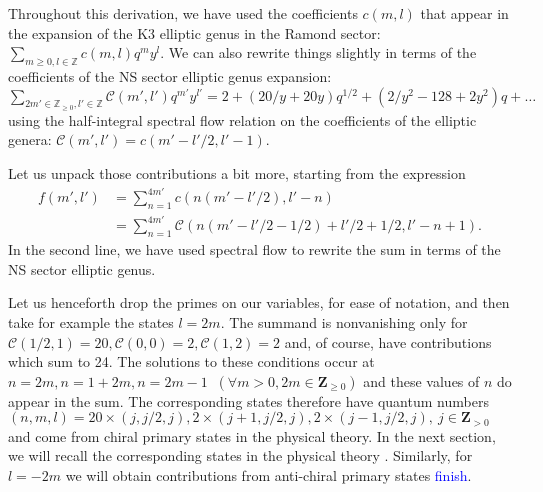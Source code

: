 \documentclass[11pt]{amsart}
\newcommand{\Z}{\mathbf Z}
\theoremstyle{thm}
\numberwithin{equation}{subsection}
\theoremstyle{def}
\theoremstyle{rem}
\begin{document}
Throughout this derivation, we have used the coefficients $c(m, l)$ that appear in the expansion of the K3 elliptic genus in the Ramond sector: $\sum_{m \geq 0, l \in \mathbb{Z}} c(m, l) q^m y^l$. We can also rewrite things slightly in terms of the coefficients of the NS sector elliptic genus expansion: $\sum_{2 m' \in \mathbb{Z}_{\geq 0}, l' \in \mathbb{Z}} \mathcal{C}(m', l') q^{m'} y^{l'} = 2 + (20/y + 20 y)q^{1/2} + (2/y^2 - 128 + 2 y^2)q + \ldots$ using the half-integral spectral flow relation on the coefficients of the elliptic genera: $\mathcal{C}(m', l') = c(m'-l'/2, l'-1)$. 


Let us unpack those contributions a bit more, starting from the expression 
\begin{align*}\label{eq:fml1}
f(m', l') &= \sum_{n=1}^{4m'}c(n(m'-l'/2), l'-n) \\
&= \sum_{n=1}^{4m'}\mathcal{C}(n(m'-l'/2 - 1/2) + l'/2 + 1/2, l' - n +1).
\end{align*} In the second line, we have used spectral flow to rewrite the sum in terms of the NS sector elliptic genus.


Let us henceforth drop the primes on our variables, for ease of notation, and then take for example the states $l = 2 m$. The summand is nonvanishing only for $\mathcal{C}(1/2, 1)= 20, \mathcal{C}(0, 0)=2, \mathcal{C}(1, 2)= 2$ and, of course, have contributions which sum to 24. The solutions to these conditions occur at $n=2m, n = 1 + 2m, n=2m -1$ $ \ (\forall m >0, 2m \in \Z_{\geq 0})$ and these values of $n$ do appear in the sum. The corresponding states therefore have quantum numbers $(n, m, l) = 20\times(j, j/2, j), 2\times(j + 1, j/2, j), 2\times(j-1, j/2, j), \ j \in \Z_{>0}$ and come from chiral primary states in the physical theory. In the next section, we will recall the corresponding states in the physical theory \cite{luninmathur, others...}. Similarly, for $l = -2m$ we will obtain contributions from anti-chiral primary states \textcolor{blue}{finish}. 
\end{document}
